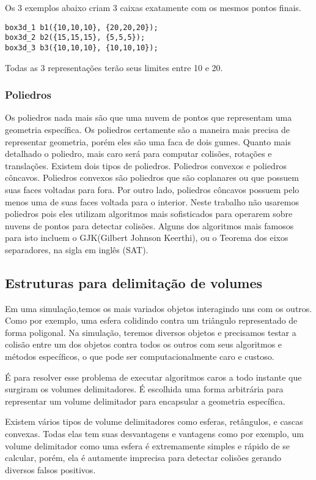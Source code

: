 Os 3 exemplos abaixo criam 3 caixas exatamente com os mesmos pontos finais.

\begin{lstlisting}[frame=single,caption=Código de exemplo\label{example_box3d}]
box3d_1 b1({10,10,10}, {20,20,20});
box3d_2 b2({15,15,15}, {5,5,5});
box3d_3 b3({10,10,10}, {10,10,10});
\end{lstlisting}

Todas as 3 representações terão seus limites entre 10 e 20.


\subsubsection{Poliedros}

Os poliedros nada mais são que uma nuvem de pontos que representam uma
geometria específica. Os poliedros certamente são a maneira mais precisa de
representar geometria, porém eles são uma faca de dois gumes. Quanto mais
detalhado o poliedro, mais caro será para computar colisões, rotações e
translações. Existem dois tipos de poliedros. Poliedros convexos e poliedros
côncavos. Poliedros convexos são poliedros que são coplanares ou que possuem
suas faces voltadas para fora. Por outro lado, poliedros côncavos possuem
pelo menos uma de suas faces voltada para o interior.
Neste trabalho não usaremos poliedros pois eles utilizam algoritmos mais
sofisticados para operarem sobre nuvens de pontos para detectar colisões.
Alguns dos algoritmos mais famosos para isto incluem o
GJK(Gilbert Johnson Keerthi), ou o Teorema dos eixos separadores, na sigla em
inglês (SAT).

\subsection{ Estruturas para delimitação de volumes}
Em uma simulação,temos os mais variados objetos interagindo uns com os outros.
Como por exemplo, uma esfera colidindo contra um triângulo representado de
forma poligonal. Na simulação, teremos diversos objetos e precisamos testar a
colisão entre um dos objetos contra todos os outros com seus algoritmos e
métodos específicos, o que pode ser computacionalmente caro e custoso.

É para resolver esse problema de executar algoritmos caros a todo instante que
surgiram os volumes delimitadores. É escolhida uma forma arbitrária para
representar um volume delimitador para encapsular a geometria específica.

Existem vários tipos de volume delimitadores como esferas, retângulos, e cascas
convexas. Todas elas tem suas desvantagens e vantagens como por exemplo, um
volume delimitador como uma esfera é extremamente simples e rápido de se
calcular, porém, ela é autamente imprecisa para detectar colisões gerando
diversos falsos positivos.


